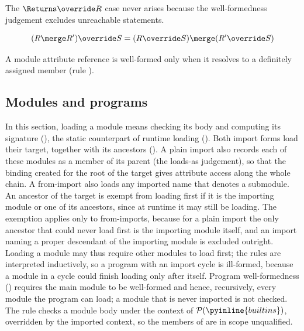 \noindent The $\Returns \override R$ case never arises because the well-formedness judgement excludes unreachable statements.

\begin{lemma}
\[
(R \merge R') \override S = (R \override S) \merge (R' \override S)
\]
\end{lemma}

\noindent A module attribute reference is well-formed only when it resolves to a definitely assigned member
(rule ).




\subsection{Modules and programs}
\label{sec:wf-modules}

In this section, loading a module means checking its body and computing its signature
(), the static counterpart of runtime loading (). Both
import forms load their target, together with its ancestors
(). A plain import also records each of these modules as a member of its
parent (the loads-as judgement), so that the binding created for the root of the target gives attribute
access along the whole chain. A from-import also loads any imported name that denotes a submodule. An
ancestor of the target is exempt from loading first if it is the importing module or one of its
ancestors, since at runtime it may still be loading. The exemption applies only to from-imports, because
for a plain import
the only ancestor that could never load first is the importing module itself, and an import naming a proper
descendant of the importing module is excluded outright. Loading a module
may thus require other modules to load first; the rules are interpreted inductively, so a program with an
import cycle is ill-formed, because a module in a cycle could finish loading only after itself. Program
well-formedness () requires the main module to be well-formed and hence,
recursively, every module the program can load; a module that is never imported is not checked.
The rule  checks a module body under the context of $\mathcal{P}(\pyinline{builtins})$,
overridden by the imported context, so the members of  are in scope
unqualified.

